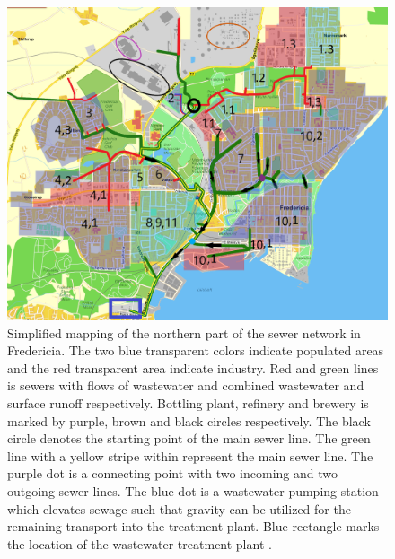 \begin{figure}[H]
\centering
\includegraphics[width=1\textwidth]{report/system_overview/pictures/kloakgrid_simplified9_temp.png}
\caption{Simplified mapping of the northern part of the sewer network in Fredericia. The two blue transparent colors indicate populated areas and the red transparent area indicate industry. Red and green lines is sewers with flows of wastewater and combined wastewater and surface runoff  respectively. Bottling plant, refinery and brewery is marked by purple, brown and black circles respectively. The black circle denotes the starting point of the main sewer line. The green line with a yellow stripe within represent the main sewer line. The purple dot is a connecting point with two incoming and two outgoing sewer lines. The blue dot is a wastewater pumping station which elevates sewage such that gravity can be utilized for the remaining transport into the treatment plant. Blue rectangle marks the location of the wastewater treatment plant .
\cite{Krak} \cite{GIS_kort}}
\label{fig:kloakgrid_simplified}
\end{figure}

